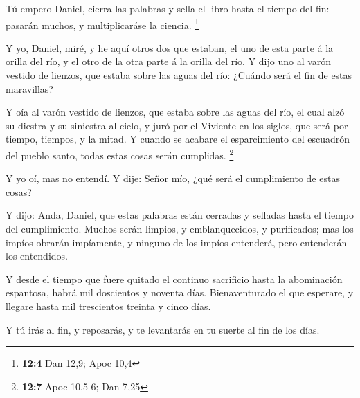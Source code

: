  Tú empero Daniel, cierra las palabras y sella el libro
hasta el tiempo del fin: pasarán muchos, y multiplicaráse la ciencia.
\footnote{\textbf{12:4} Dan 12,9; Apoc 10,4}

 Y yo, Daniel, miré, y he aquí otros dos que estaban, el uno
de esta parte á la orilla del río, y el otro de la otra parte á la
orilla del río.  Y dijo uno al varón vestido de lienzos, que
estaba sobre las aguas del río: ¿Cuándo será el fin de estas maravillas?

 Y oía al varón vestido de lienzos, que estaba sobre las
aguas del río, el cual alzó su diestra y su siniestra al cielo, y juró
por el Viviente en los siglos, que será por tiempo, tiempos, y la mitad.
Y cuando se acabare el esparcimiento del escuadrón del pueblo santo,
todas estas cosas serán cumplidas. \footnote{\textbf{12:7} Apoc 10,5-6;
  Dan 7,25}

 Y yo oí, mas no entendí. Y dije: Señor mío, ¿qué será el
cumplimiento de estas cosas?

 Y dijo: Anda, Daniel, que estas palabras están cerradas y
selladas hasta el tiempo del cumplimiento.  Muchos serán
limpios, y emblanquecidos, y purificados; mas los impíos obrarán
impíamente, y ninguno de los impíos entenderá, pero entenderán los
entendidos.

 Y desde el tiempo que fuere quitado el continuo sacrificio
hasta la abominación espantosa, habrá mil doscientos y noventa días.
 Bienaventurado el que esperare, y llegare hasta mil
trescientos treinta y cinco días.

 Y tú irás al fin, y reposarás, y te levantarás en tu
suerte al fin de los días.
